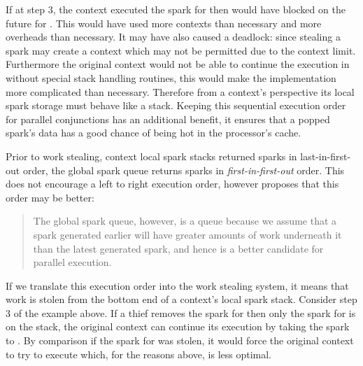 If at step 3,
the context executed the spark for  then
 would have blocked on the future for .
This would have used more contexts than necessary and more overheads than
necessary.
It may have also caused a deadlock:
since stealing a spark may create a context which may not be permitted due
to the context limit.
Furthermore
the original context would not be able to continue the execution in 
without special stack handling routines,
this would make the implementation more complicated than necessary.
Therefore from a context's perspective its local spark storage must behave
like a stack.
Keeping this sequential execution order for parallel conjunctions has
an additional benefit,
it ensures that a popped spark's data has a good chance of being hot in the
processor's cache.

Prior to work stealing,
context local spark stacks returned sparks in last-in-first-out
order,
the global spark queue returns sparks in \emph{first-in-first-out} order.
This does not encourage a left to right execution order,
however \citet{wang:2006:hons} proposes that this order may be better:

\begin{quote}
The global spark queue, however, is a queue because we assume that a
spark generated earlier will have greater amounts of work underneath it
than the latest generated spark, and hence is a better candidate for
parallel execution.
\end{quote}

\noindent
If we translate this execution order into the work stealing system,
it means that work is stolen from the bottom end of a context's local spark
stack.
Consider step 3 of the example above.
If a thief removes the spark for 
then only the spark for  is on the stack,
the original context can continue its execution by taking the spark to
.
By comparison if the spark for  was stolen,
it would force the original context to try to execute 
which, for the reasons above, is less optimal.

